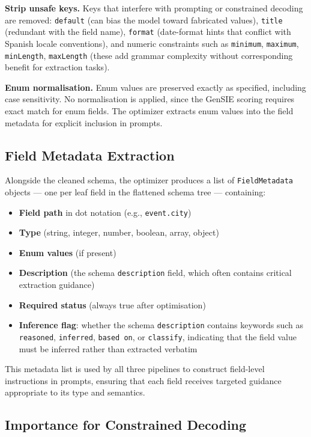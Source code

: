 \documentclass{ceurart}
\begin{document}
\textbf{Strip unsafe keys.}
Keys that interfere with prompting or constrained decoding are removed:
\texttt{default} (can bias the model toward fabricated values), \texttt{title}
(redundant with the field name), \texttt{format} (date-format hints that conflict
with Spanish locale conventions), and numeric constraints such as \texttt{minimum},
\texttt{maximum}, \texttt{minLength}, \texttt{maxLength} (these add grammar complexity
without corresponding benefit for extraction tasks).

\textbf{Enum normalisation.}
Enum values are preserved exactly as specified, including case sensitivity.
No normalisation is applied, since the GenSIE scoring requires exact match for enum
fields.
The optimizer extracts enum values into the field metadata for explicit inclusion in
prompts.

\subsection{Field Metadata Extraction}

Alongside the cleaned schema, the optimizer produces a list of \texttt{FieldMetadata}
objects --- one per leaf field in the flattened schema tree --- containing:

\begin{itemize}
\item \textbf{Field path} in dot notation (e.g., \texttt{event.city})
\item \textbf{Type} (string, integer, number, boolean, array, object)
\item \textbf{Enum values} (if present)
\item \textbf{Description} (the schema \texttt{description} field, which often contains
  critical extraction guidance)
\item \textbf{Required status} (always true after optimisation)
\item \textbf{Inference flag}: whether the schema \texttt{description} contains
  keywords such as \texttt{reasoned}, \texttt{inferred}, \texttt{based on}, or
  \texttt{classify}, indicating that the field value must be inferred rather than
  extracted verbatim
\end{itemize}

This metadata list is used by all three pipelines to construct field-level instructions
in prompts, ensuring that each field receives targeted guidance appropriate to its type
and semantics.

\subsection{Importance for Constrained Decoding}
\end{document}
